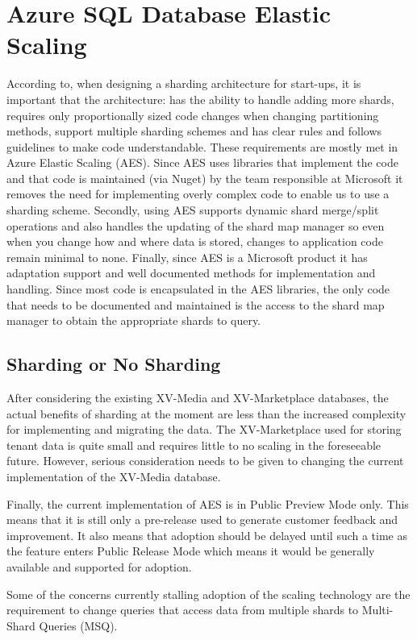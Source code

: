  
 \section{Azure SQL Database Elastic Scaling}
 
According to\cite{Ries2009-td}, when designing a sharding architecture for start-ups, it is important that the architecture: has the ability to handle adding more shards, requires only proportionally sized code changes when changing partitioning methods, support multiple sharding schemes and has clear rules and follows guidelines to make code understandable.
These requirements are mostly met in Azure Elastic Scaling (AES). Since AES uses libraries that implement the code and that code is maintained (via Nuget) by the team responsible at Microsoft it removes the need for implementing overly complex code to enable us to use a sharding scheme. Secondly, using AES supports dynamic shard merge/split operations and also handles the updating of the shard map manager so even when you change how and where data is stored, changes to application code remain minimal to none. Finally, since AES is a Microsoft product it has adaptation support and well documented methods for implementation and handling. Since most code is encapsulated in the AES libraries, the only code that needs to be documented and maintained is the access to the shard map manager to obtain the appropriate shards to query.

\subsection{Sharding or No Sharding}

After considering the existing XV-Media and XV-Marketplace databases, the actual benefits of sharding at the moment are less than the increased complexity for implementing and migrating the data. The XV-Marketplace used for storing tenant data is quite small and requires little to no scaling in the foreseeable future. However, serious consideration needs to be given to changing the current implementation of the XV-Media database.
 
Finally, the current implementation of AES is in Public Preview Mode only. This means that it is still only a pre-release used to generate customer feedback and improvement. It also means that adoption should be delayed until such a time as the feature enters Public Release Mode which means it would be generally available and supported for adoption.
 
Some of the concerns currently stalling adoption of the scaling technology are the requirement to change queries that access data from multiple shards to Multi-Shard Queries (MSQ).

